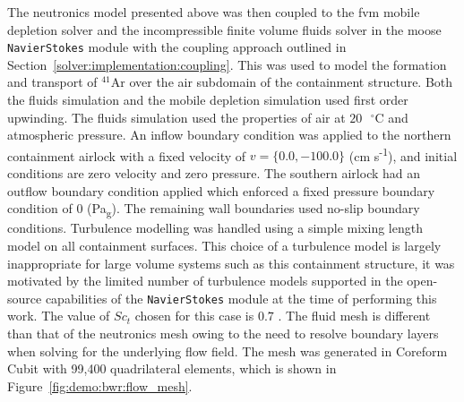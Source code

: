 The neutronics model presented above was then coupled to the \acrshort{fvm} mobile depletion solver and the incompressible finite volume fluids solver in the \acrshort{moose} \texttt{NavierStokes} module with the coupling approach outlined in Section~\ref{solver:implementation:coupling}. This was used to model the formation and transport of $\mathrm{^{41}Ar}$ over the air subdomain of the containment structure. Both the fluids simulation and the mobile depletion simulation used first order upwinding. The fluids simulation used the properties of air at $\mathrm{20\text{ }^{\circ}C}$ and atmospheric pressure. An inflow boundary condition was applied to the northern containment airlock with a fixed velocity of $v = \{0.0, -100.0\}$ (cm s\textsuperscript{-1}), and initial conditions are zero velocity and zero pressure. The southern airlock had an outflow boundary condition applied which enforced a fixed pressure boundary condition of $0$ (Pa\textsubscript{g}). The remaining wall boundaries used no-slip boundary conditions. Turbulence modelling was handled using a simple mixing length model on all containment surfaces. This choice of a turbulence model is largely inappropriate for large volume systems such as this containment structure, it was motivated by the limited number of turbulence models supported in the open-source capabilities of the \texttt{NavierStokes} module at the time of performing this work. The value of $Sc_{t}$ chosen for this case is $0.7$ \cite{turbulent_schmidt_numbers}. The fluid mesh is different than that of the neutronics mesh owing to the need to resolve boundary layers when solving for the underlying flow field. The mesh was generated in Coreform Cubit with 99,400 quadrilateral elements, which is shown in Figure~\ref{fig:demo:bwr:flow_mesh}. 

